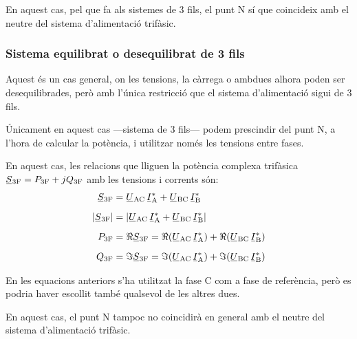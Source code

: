 En aquest cas, pel que fa als sistemes de 3 fils,  el punt N sí
que coincideix amb el neutre del sistema d'alimentació trifàsic.

\subsubsection{Sistema equilibrat o desequilibrat de 3 fils}

Aquest és un cas  general, on les tensions, la càrrega o ambdues alhora  poden ser desequilibrades, però amb l'única restricció que
el sistema d'alimentació sigui de 3 fils.

 Únicament en aquest cas ---sistema de 3 fils--- podem prescindir del punt N, a l'hora de
calcular la potència, i utilitzar només les tensions entre fases.

En aquest cas, les relacions que lliguen la potència complexa
trifàsica $\cmplx{S}\ped{3F} = P\ped{3F} + j Q\ped{3F}$ amb les
tensions i corrents són:
\begin{align}
    \cmplx{S}\ped{3F} &= \cmplx{U}\ped{AC} \,\cmplx{I}\ped{A}^*
     +  \cmplx{U}\ped{BC} \,\cmplx{I}\ped{B}^*  \label{eq:s_3f_3fils}\\[2mm]
    |\cmplx{S}\ped{3F}| &= |\cmplx{U}\ped{AC}\, \cmplx{I}\ped{A}^* +
    \cmplx{U}\ped{BC}\, \cmplx{I}\ped{B}^*| \\[2mm]
    P\ped{3F} &= \Re\cmplx{S}\ped{3F}= \Re(\cmplx{U}\ped{AC}\, \cmplx{I}\ped{A}^*) +
    \Re(\cmplx{U}\ped{BC}\, \cmplx{I}\ped{B}^*) \\[2mm]
    Q\ped{3F} &= \Im\cmplx{S}\ped{3F}=\Im(\cmplx{U}\ped{AC} \,\cmplx{I}\ped{A}^*) +
    \Im(\cmplx{U}\ped{BC} \,\cmplx{I}\ped{B}^*)
\end{align}

En les equacions anteriors s'ha utilitzat la fase C com a
fase de referència, però es podria haver escollit també qualsevol de
les altres dues.

En aquest cas, el punt N tampoc no coincidirà en general amb
el neutre del sistema d'alimentació trifàsic.

